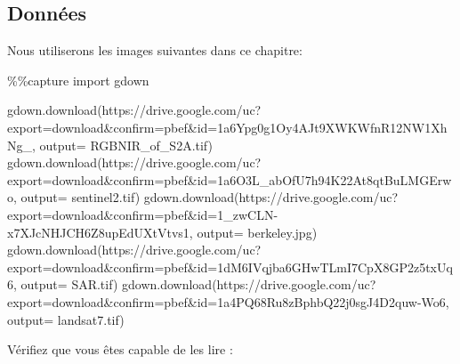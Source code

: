 \documentclass[
  11pt,
  letterpaper,
  open=any,
  twoside=false,
  french]{scrbook}
\newenvironment{Shaded}{\begin{snugshade}}{\end{snugshade}}
\newcommand{\ImportTok}[1]{\textcolor[rgb]{0.00,0.46,0.62}{#1}}
\newcommand{\NormalTok}[1]{\textcolor[rgb]{0.00,0.23,0.31}{#1}}
\newcommand{\OperatorTok}[1]{\textcolor[rgb]{0.37,0.37,0.37}{#1}}
\newcommand{\StringTok}[1]{\textcolor[rgb]{0.13,0.47,0.30}{#1}}
\begin{document}
\subsection{Données}\label{donnuxe9es-1}

Nous utiliserons les images suivantes dans ce chapitre:

\begin{Shaded}
\begin{Highlighting}[]
\OperatorTok{\%\%}\NormalTok{capture}
\ImportTok{import}\NormalTok{ gdown}

\NormalTok{gdown.download(}\StringTok{\textquotesingle{}https://drive.google.com/uc?export=download\&confirm=pbef\&id=1a6Ypg0g1Oy4AJt9XWKWfnR12NW1XhNg\_\textquotesingle{}}\NormalTok{, output}\OperatorTok{=} \StringTok{\textquotesingle{}RGBNIR\_of\_S2A.tif\textquotesingle{}}\NormalTok{)}
\NormalTok{gdown.download(}\StringTok{\textquotesingle{}https://drive.google.com/uc?export=download\&confirm=pbef\&id=1a6O3L\_abOfU7h94K22At8qtBuLMGErwo\textquotesingle{}}\NormalTok{, output}\OperatorTok{=} \StringTok{\textquotesingle{}sentinel2.tif\textquotesingle{}}\NormalTok{)}
\NormalTok{gdown.download(}\StringTok{\textquotesingle{}https://drive.google.com/uc?export=download\&confirm=pbef\&id=1\_zwCLN{-}x7XJcNHJCH6Z8upEdUXtVtvs1\textquotesingle{}}\NormalTok{, output}\OperatorTok{=} \StringTok{\textquotesingle{}berkeley.jpg\textquotesingle{}}\NormalTok{)}
\NormalTok{gdown.download(}\StringTok{\textquotesingle{}https://drive.google.com/uc?export=download\&confirm=pbef\&id=1dM6IVqjba6GHwTLmI7CpX8GP2z5txUq6\textquotesingle{}}\NormalTok{, output}\OperatorTok{=} \StringTok{\textquotesingle{}SAR.tif\textquotesingle{}}\NormalTok{)}
\NormalTok{gdown.download(}\StringTok{\textquotesingle{}https://drive.google.com/uc?export=download\&confirm=pbef\&id=1a4PQ68Ru8zBphbQ22j0sgJ4D2quw{-}Wo6\textquotesingle{}}\NormalTok{, output}\OperatorTok{=} \StringTok{\textquotesingle{}landsat7.tif\textquotesingle{}}\NormalTok{)}
\end{Highlighting}
\end{Shaded}

Vérifiez que vous êtes capable de les lire :
\end{document}

